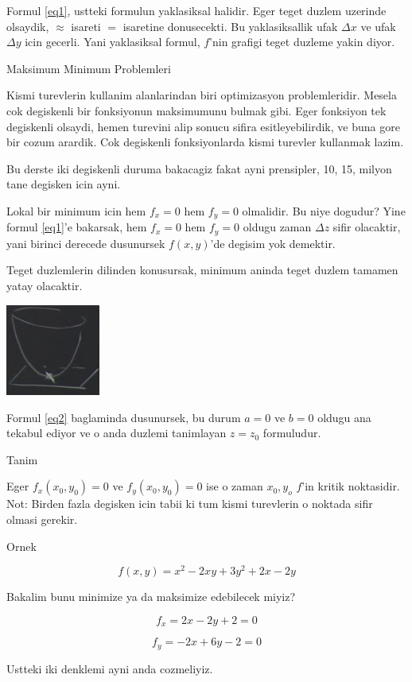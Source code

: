 \documentclass[12pt,fleqn]{article}
\begin{document}
Formul \ref{eq1}, ustteki formulun yaklasiksal halidir. Eger teget duzlem
uzerinde olsaydik, $\approx$ isareti $=$ isaretine donusecekti. Bu
yaklasiksallik ufak $\Delta x$ ve ufak $\Delta y$ icin gecerli. Yani
yaklasiksal formul, $f$'nin grafigi teget duzleme yakin diyor. 

Maksimum Minimum Problemleri 

Kismi turevlerin kullanim alanlarindan biri optimizasyon
problemleridir. Mesela cok degiskenli bir fonksiyonun maksimumunu bulmak
gibi. Eger fonksiyon tek degiskenli olsaydi, hemen turevini alip sonucu
sifira esitleyebilirdik, ve buna gore bir cozum arardik. Cok degiskenli
fonksiyonlarda kismi turevler kullanmak lazim. 

Bu derste iki degiskenli duruma bakacagiz fakat ayni prensipler, 10, 15,
milyon tane degisken icin ayni. 

Lokal bir minimum icin hem $f_x=0$ hem $f_y=0$ olmalidir. Bu niye
dogudur? Yine formul \ref{eq1}'e bakarsak, hem $f_x=0$ hem $f_y=0$ oldugu
zaman $\Delta z$ sifir olacaktir, yani birinci derecede dusunursek
$f(x,y)$'de degisim yok demektir. 

Teget duzlemlerin dilinden konusursak, minimum aninda teget duzlem tamamen
yatay olacaktir. 

\includegraphics[height=3cm]{9_3.png}

Formul \ref{eq2} baglaminda dusunursek, bu durum $a=0$ ve $b=0$ oldugu ana
tekabul ediyor ve o anda duzlemi tanimlayan $z = z_0$ formuludur. 

Tanim

Eger $f_x(x_0,y_0)= 0$ ve $f_y(x_0,y_0)= 0$ ise o zaman $x_0,y_o$ $f$'in
kritik noktasidir. Not: Birden fazla degisken icin tabii ki tum kismi
turevlerin o noktada sifir olmasi gerekir.

Ornek

\[ f(x,y) = x^2 - 2xy + 3y^2 + 2x - 2y \]

Bakalim bunu minimize ya da maksimize edebilecek miyiz? 

\[ f_x = 2x - 2y + 2 = 0\]

\[ f_y = -2x + 6y - 2 = 0 \]

Ustteki iki denklemi ayni anda cozmeliyiz. 
\end{document}

